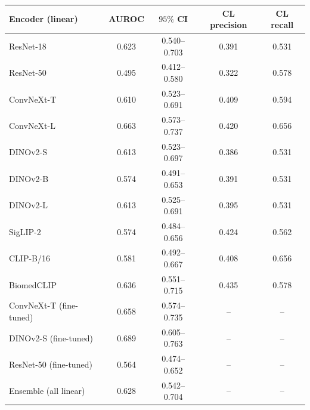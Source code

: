 \begin{tabular}{@{}lcccc@{}}\toprule
Encoder (linear) & AUROC & $95\%$ CI & CL precision & CL recall\\\midrule
ResNet-18 & 0.623 & 0.540--0.703 & 0.391 & 0.531\\
ResNet-50 & 0.495 & 0.412--0.580 & 0.322 & 0.578\\
ConvNeXt-T & 0.610 & 0.523--0.691 & 0.409 & 0.594\\
ConvNeXt-L & 0.663 & 0.573--0.737 & 0.420 & 0.656\\
DINOv2-S & 0.613 & 0.523--0.697 & 0.386 & 0.531\\
DINOv2-B & 0.574 & 0.491--0.653 & 0.391 & 0.531\\
DINOv2-L & 0.613 & 0.525--0.691 & 0.395 & 0.531\\
SigLIP-2 & 0.574 & 0.484--0.656 & 0.424 & 0.562\\
CLIP-B/16 & 0.581 & 0.492--0.667 & 0.408 & 0.656\\
BiomedCLIP & 0.636 & 0.551--0.715 & 0.435 & 0.578\\
ConvNeXt-T (fine-tuned) & 0.658 & 0.574--0.735 & -- & --\\
DINOv2-S (fine-tuned) & 0.689 & 0.605--0.763 & -- & --\\
ResNet-50 (fine-tuned) & 0.564 & 0.474--0.652 & -- & --\\
Ensemble (all linear) & 0.628 & 0.542--0.704 & -- & --\\
\bottomrule\end{tabular}

